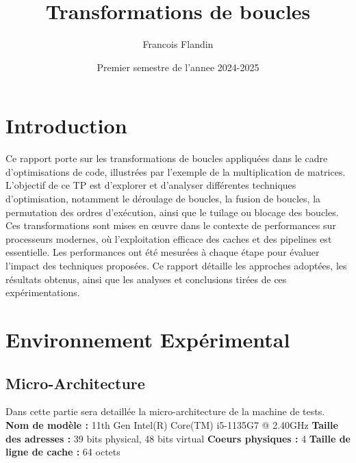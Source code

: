 \documentclass{rapport}
\title{Transformations de boucles}
\author{Francois Flandin}
\date{Premier semestre de l'annee 2024-2025}
\begin{document}
\maketitle

\clearpage
\tableofcontents

\clearpage
\section{Introduction}
Ce rapport porte sur les transformations de boucles appliquées dans le cadre d'optimisations de code, illustrées par l'exemple de la multiplication de matrices. \newline
L'objectif de ce TP est d'explorer et d'analyser différentes techniques d'optimisation, notamment le déroulage de boucles, la fusion de boucles, la permutation des ordres d'exécution, ainsi que le tuilage ou blocage des boucles.\newline 
Ces transformations sont mises en œuvre dans le contexte de performances sur processeurs modernes, où l'exploitation efficace des caches et des pipelines est essentielle.\newline
Les performances ont été mesurées à chaque étape pour évaluer l'impact des techniques proposées.\newline
Ce rapport détaille les approches adoptées, les résultats obtenus, ainsi que les analyses et conclusions tirées de ces expérimentations.

\section*{Environnement Expérimental}
    \subsection*{Micro-Architecture}
    Dans cette partie sera detaillée la micro-architecture de la machine de tests.
    \newline\newline
    \textbf{Nom de modèle :} 11th Gen Intel(R) Core(TM) i5-1135G7 @ 2.40GHz
    \newline
    \textbf{Taille des adresses :} 39 bits physical, 48 bits virtual
    \newline
    \textbf{Coeurs physiques :} 4
    \newline
    \textbf{Taille de ligne de cache :} 64 octets
\end{document}
